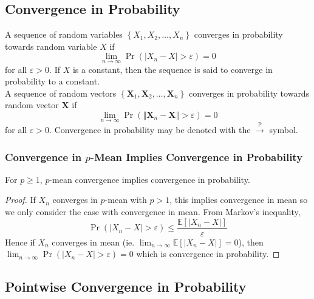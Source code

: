 \documentclass[11pt]{report} %
\begin{document}
\subsection{Convergence in Probability}

A sequence of random variables $\left\{X_{1}, X_{2}, \dots, X_{n} \right\}$ converges in probability towards random variable $X$ if
\begin{equation}
\lim_{n\to \infty}\operatorname{Pr}\left(\left|X_{n} - X\right| > \varepsilon\right) = 0
\end{equation} 
for all $\varepsilon > 0$. If $X$ is a constant, then the sequence is said to converge in probability to a constant.\\

A sequence of random vectors $\left\{\mathbf{X}_{1}, \mathbf{X}_{2}, \dots, \mathbf{X}_{n} \right\}$ converges in probability towards random vector $\mathbf{X}$ if
\begin{equation}
\lim_{n\to \infty}\operatorname{Pr}\left(\left\Vert \mathbf{X}_{n} - \mathbf{X}\right\Vert > \varepsilon\right) = 0
\end{equation} 
for all $\varepsilon > 0$. Convergence in probability may be denoted with the $\overset{\mathrm{p}}\to$ symbol.

\subsubsection{Convergence in $p$-Mean Implies Convergence in Probability}

For $p \geq 1$, $p$-mean convergence implies convergence in probability.
\begin{proof}
If $X_{n}$ converges in $p$-mean with $p > 1$, this implies convergence in mean so we only consider the case with convergence in mean. From Markov's inequality,
\begin{equation}
\operatorname{Pr}\left(\left|X_{n} - X\right| > \varepsilon\right) \leq \dfrac{\mathbb{E}\left[\left|X_{n} - X\right|\right]}{\varepsilon}
\end{equation}
Hence if $X_{n}$ converges in mean (ie. $\lim_{n \to \infty}\mathbb{E}\left[\left|X_{n} - X\right|\right] = 0$), then $\lim_{n\to \infty}\operatorname{Pr}\left(\left|X_{n} - X\right| > \varepsilon\right) = 0$ which is convergence in probability.
\end{proof}

\subsection{Pointwise Convergence in Probability}
\end{document}
